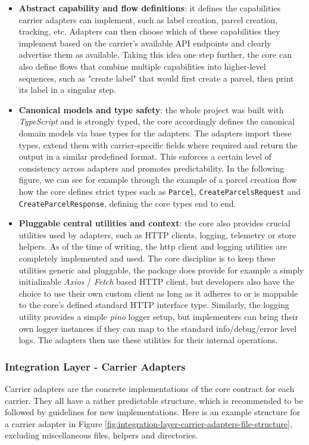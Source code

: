 \documentclass{imc-inf}
\begin{document}
\begin{itemize}[itemsep=3pt]
  \item \textbf{Abstract capability and flow definitions}: it defines the capabilities carrier adapters can implement, such as label creation, parcel creation, tracking, etc. Adapters can then choose which of these capabilities they implement based on the carrier's available API endpoints and clearly advertise them as available. Taking this idea one step further, the core can also define flows that combine multiple capabilities into higher-level sequences, such as "create label" that would first create a parcel, then print its label in a singular step.
  \item \textbf{Canonical models and type safety}: the whole project was built with \textit{TypeScript} and is strongly typed, the core accordingly defines the canonical domain models via base types for the adapters. The adapters import these types, extend them with carrier-specific fields where required and return the output in a similar predefined format. This enforces a certain level of consistency across adapters and promotes predictability. In the following figure, we can see for example through the example of a parcel creation flow how the core defines strict types such as \texttt{Parcel}, \texttt{CreateParcelsRequest} and \texttt{CreateParcelResponse}, defining the core types end to end.
  \item \textbf{Pluggable central utilities and context}: the core also provides crucial utilities used by adapters, such as HTTP clients, logging, telemetry or store helpers. As of the time of writing, the http client and logging utilities are completely implemented and used. The core discipline is to keep these utilities generic and pluggable, the package does provide for example a simply initializable \textit{Axios} / \textit{Fetch} based HTTP client, but developers also have the choice to use their own custom client as long as it adheres to or is mappable to the core's defined standard HTTP interface type. Similarly, the logging utility provides a simple \textit{pino} logger setup, but implementers can bring their own logger instances if they can map to the standard info/debug/error level logs. The adapters then use these utilities for their internal operations.
\end{itemize}

\subsubsection{Integration Layer - Carrier Adapters}
Carrier adapters are the concrete implementations of the core contract for each carrier.
They all have a rather predictable structure, which is recommended to be followed by guidelines for new implementations.
Here is an example structure for a carrier adapter in Figure \ref{fig:integration-layer-carrier-adapters-file-structure}, excluding miscellaneous files, helpers and directories.
\end{document}
